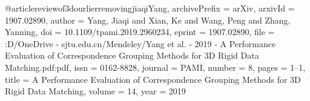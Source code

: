 @article{reviewof3dourlierremovingjiaqiYang,
archivePrefix = {arXiv},
arxivId = {1907.02890},
author = {Yang, Jiaqi and Xian, Ke and Wang, Peng and Zhang, Yanning},
doi = {10.1109/tpami.2019.2960234},
eprint = {1907.02890},
file = {:D\:/OneDrive - sjtu.edu.cn/Mendeley/Yang et al. - 2019 - A Performance Evaluation of Correspondence Grouping Methods for 3D Rigid Data Matching.pdf:pdf},
issn = {0162-8828},
journal = PAMI,
number = {8},
pages = {1--1},
title = {A Performance Evaluation of Correspondence Grouping Methods for 3D Rigid Data Matching},
volume = {14},
year = {2019}
}